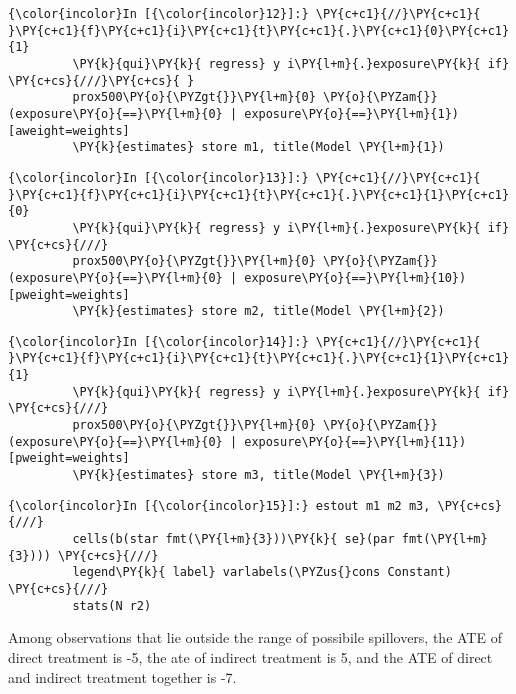 \documentclass[11pt,notitlepage]{article}\usepackage[]{graphicx}\usepackage[]{color}
\makeatletter
\newenvironment{kframe}{%
 \def\at@end@of@kframe{}%
 \ifinner\ifhmode%
  \def\at@end@of@kframe{\end{minipage}}%
  \begin{minipage}{\columnwidth}%
 \fi\fi%
 \def\FrameCommand##1{\hskip\@totalleftmargin \hskip-\fboxsep
 \colorbox{shadecolor}{##1}\hskip-\fboxsep
     \hskip-\linewidth \hskip-\@totalleftmargin \hskip\columnwidth}%
 \MakeFramed {\advance\hsize-\width
   \@totalleftmargin\z@ \linewidth\hsize
   \@setminipage}}%
 {\par\unskip\endMakeFramed%
 \at@end@of@kframe}
\newenvironment{knitrout}{}{} %
\makeatother
\begin{document}
\begin{enumerate}[a)]
\begin{knitrout}
\begin{kframe}
    \begin{Verbatim}[commandchars=\\\{\}]
{\color{incolor}In [{\color{incolor}12}]:} \PY{c+c1}{//}\PY{c+c1}{ }\PY{c+c1}{f}\PY{c+c1}{i}\PY{c+c1}{t}\PY{c+c1}{.}\PY{c+c1}{0}\PY{c+c1}{1}
         \PY{k}{qui}\PY{k}{ regress} y i\PY{l+m}{.}exposure\PY{k}{ if} \PY{c+cs}{///}\PY{c+cs}{ }
         prox500\PY{o}{\PYZgt{}}\PY{l+m}{0} \PY{o}{\PYZam{}} (exposure\PY{o}{==}\PY{l+m}{0} | exposure\PY{o}{==}\PY{l+m}{1}) [aweight=weights]
         \PY{k}{estimates} store m1, title(Model \PY{l+m}{1})
\end{Verbatim}

    \begin{Verbatim}[commandchars=\\\{\}]
{\color{incolor}In [{\color{incolor}13}]:} \PY{c+c1}{//}\PY{c+c1}{ }\PY{c+c1}{f}\PY{c+c1}{i}\PY{c+c1}{t}\PY{c+c1}{.}\PY{c+c1}{1}\PY{c+c1}{0}
         \PY{k}{qui}\PY{k}{ regress} y i\PY{l+m}{.}exposure\PY{k}{ if} \PY{c+cs}{///}
         prox500\PY{o}{\PYZgt{}}\PY{l+m}{0} \PY{o}{\PYZam{}} (exposure\PY{o}{==}\PY{l+m}{0} | exposure\PY{o}{==}\PY{l+m}{10}) [pweight=weights]
         \PY{k}{estimates} store m2, title(Model \PY{l+m}{2})
\end{Verbatim}

    \begin{Verbatim}[commandchars=\\\{\}]
{\color{incolor}In [{\color{incolor}14}]:} \PY{c+c1}{//}\PY{c+c1}{ }\PY{c+c1}{f}\PY{c+c1}{i}\PY{c+c1}{t}\PY{c+c1}{.}\PY{c+c1}{1}\PY{c+c1}{1}
         \PY{k}{qui}\PY{k}{ regress} y i\PY{l+m}{.}exposure\PY{k}{ if} \PY{c+cs}{///}
         prox500\PY{o}{\PYZgt{}}\PY{l+m}{0} \PY{o}{\PYZam{}} (exposure\PY{o}{==}\PY{l+m}{0} | exposure\PY{o}{==}\PY{l+m}{11}) [pweight=weights]
         \PY{k}{estimates} store m3, title(Model \PY{l+m}{3})
\end{Verbatim}

    \begin{Verbatim}[commandchars=\\\{\}]
{\color{incolor}In [{\color{incolor}15}]:} estout m1 m2 m3, \PY{c+cs}{///}
         cells(b(star fmt(\PY{l+m}{3}))\PY{k}{ se}(par fmt(\PY{l+m}{3}))) \PY{c+cs}{///}
         legend\PY{k}{ label} varlabels(\PYZus{}cons Constant) \PY{c+cs}{///}
         stats(N r2)
\end{Verbatim}
\end{kframe}
\end{knitrout}

Among observations that lie outside the range of possibile spillovers, the ATE of direct treatment is -5, the ate of indirect treatment is 5, and the ATE of direct and indirect treatment together is -7.



\end{enumerate}
\end{document}
